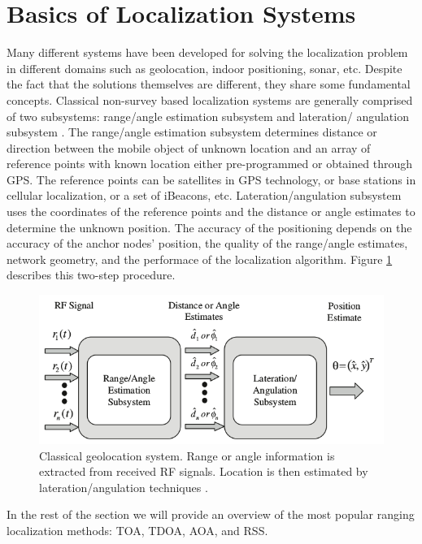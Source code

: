 \section{Basics of Localization Systems}

Many different systems have been developed for solving the localization problem in different domains such as geolocation, indoor positioning, sonar, etc. Despite the fact that the  solutions themselves are different, they share some fundamental concepts. Classical non-survey based localization systems  are generally comprised of two subsystems: range/angle estimation subsystem and lateration/
angulation subsystem \cite{GeoLoc}. The range/angle estimation subsystem determines distance or direction between the  mobile object of unknown location  and an array of reference points with known location  either pre-programmed or obtained through GPS.  The reference points can be satellites in GPS technology, or base stations in cellular localization, or a set of iBeacons, etc. Lateration/angulation subsystem uses the coordinates of the reference points and the distance or angle estimates to determine the unknown position.  The accuracy of the positioning depends on the accuracy of the anchor nodes’ position, the quality of the range/angle estimates, network geometry, and the performace of the localization algorithm. Figure \ref{fig:2step} describes this two-step procedure.


\begin{figure}[h]
\centering
\includegraphics[width=1.0\textwidth]{figures/localization_example.png}
\caption{Classical geolocation system. Range or angle information is extracted from received RF signals. Location is then estimated by lateration/angulation techniques \cite{GeoLoc}.}
\label{fig:2step}
\end{figure}


In the rest of the section we will provide an overview of the most popular ranging localization methods: TOA, TDOA, AOA, and RSS.



